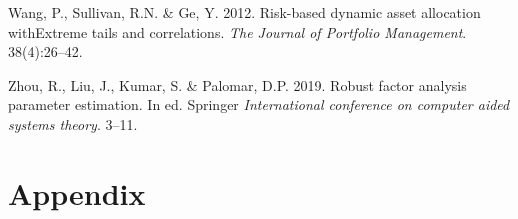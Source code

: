 \documentclass[11pt,preprint, authoryear]{elsarticle}
\numberwithin{equation}{section}
\numberwithin{figure}{section}
\numberwithin{table}{section}
\begin{document}
\leavevmode\hypertarget{ref-wang2012}{}%
Wang, P., Sullivan, R.N. \& Ge, Y. 2012. Risk-based dynamic asset
allocation withExtreme tails and correlations. \emph{The Journal of
Portfolio Management}. 38(4):26--42.

\leavevmode\hypertarget{ref-zhou2019}{}%
Zhou, R., Liu, J., Kumar, S. \& Palomar, D.P. 2019. Robust factor
analysis parameter estimation. In ed. Springer \emph{International
conference on computer aided systems theory}. 3--11.

\newpage

\hypertarget{appendix}{%
\section*{Appendix}\label{appendix}}
\end{document}
